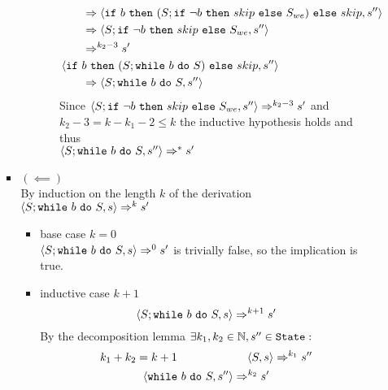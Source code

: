 \begin{exercise}
\begin{enumerate}
\begin{itemize}
\begin{itemize}
\begin{itemize}
\begin{itemize}
\begin{align*}
                                            \\&\qquad\Rightarrow \left<\texttt{if}\ b\ \texttt{then}\ (S; \texttt{if}\ \neg b\ \texttt{then}\ skip\ \texttt{else}\ S_{we})\ \texttt{else}\ skip, s''\right>
                                            \\&\qquad\Rightarrow \left<S; \texttt{if}\ \neg b\ \texttt{then}\ skip\ \texttt{else}\ S_{we}, s''\right>
                                            \\&\qquad\Rightarrow^{k_2 - 3} s'
                                            \\
                                            &\left<\texttt{if}\ b\ \texttt{then}\ (S; \texttt{while}\ b\ \texttt{do}\ S)\ \texttt{else}\ skip, s''\right>
                                            \\&\qquad\Rightarrow \left<S; \texttt{while}\ b\ \texttt{do}\ S, s''\right>
                                        \end{align*}
                                        Since $\left<S; \texttt{if}\ \neg b\ \texttt{then}\ skip\ \texttt{else}\ S_{we}, s''\right> \Rightarrow^{k_2 - 3} s'$ and $k_2 - 3 = k - k_1 - 2 \leq k$ the inductive hypothesis holds and thus \\ $\left<S; \texttt{while}\ b\ \texttt{do}\ S, s''\right> \Rightarrow^* s'$
                                    \end{itemize}
                            \end{itemize}
                        \item $(\impliedby)$ \vspace{0.2cm} \\
                            By induction on the length $k$ of the derivation $\left<S; \texttt{while}\ b\ \texttt{do}\ S, s\right> \Rightarrow^k s'$
                            \begin{itemize}
                                \item base case $k=0$ \\
                                    $\left<S; \texttt{while}\ b\ \texttt{do}\ S, s\right> \Rightarrow^0 s'$ is trivially false, so the implication is true.
                                \item inductive case $k+1$ \vspace*{-0.3cm}
                                    \[ \left<S; \texttt{while}\ b\ \texttt{do}\ S, s\right> \Rightarrow^{k+1} s' \]
                                    By the decomposition lemma $\exists k_1, k_2 \in \mathbb{N}, s'' \in \texttt{State} :$
                                    \begin{gather*}
                                        k_1 + k_2 = k + 1 \qquad\qquad\qquad \instr{S}{s} \Rightarrow^{k_1} s'' \\
                                        \instr{\wwhile{b}{S}}{s''} \Rightarrow^{k_2} s'

\end{gather*}
\end{itemize}
\end{itemize}
\end{itemize}
\end{enumerate}
\end{exercise}
